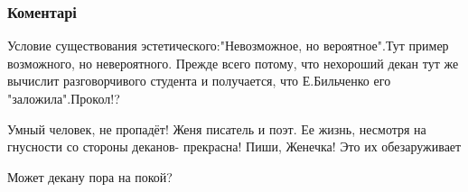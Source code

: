  
 
 
 
 
\subsubsection{Коментарі}
\label{sec:09_09_2021.fb.nikonov_sergej.3.bilchenko_dekan_agent_fsb.cmt}

\begin{itemize}
 
Условие существования эстетического:"Невозможное, но вероятное".Тут пример возможного, но невероятного. Прежде всего потому, что нехороший декан тут же вычислит разговорчивого студента и получается, что Е.Бильченко его "заложила".Прокол!?

 
Умный человек, не пропадёт! Женя писатель и поэт.
Ее жизнь, несмотря на гнусности со стороны деканов- прекрасна! Пиши, Женечка!
Это их обезаруживает

 
Может декану пора на покой?

\begin{itemize}
 

\end{itemize}
\end{itemize}
